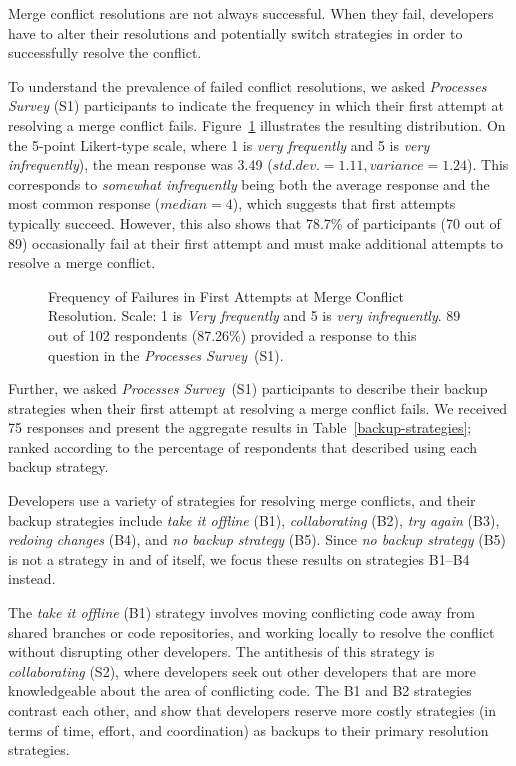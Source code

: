 
Merge conflict resolutions are not always successful.
When they fail, developers have to alter their resolutions and potentially switch strategies in order to successfully resolve the conflict.

To understand the prevalence of failed conflict resolutions, we asked \textit{Processes Survey} (S1) participants to indicate the frequency in which their first attempt at resolving a merge conflict fails.
Figure~\ref{fig:first-attempt-failure} illustrates the resulting distribution.
On the 5-point Likert-type scale, where 1 is \textit{very frequently} and 5 is \textit{very infrequently}), the mean response was 3.49 ($std. dev.=1.11, variance=1.24$).
This corresponds to \textit{somewhat infrequently} being both the average response and the most common response ($median=4$), which suggests that first attempts typically succeed.
However, this also shows that 78.7\% of participants (70 out of 89) occasionally fail at their first attempt and must make additional attempts to resolve a merge conflict.

\begin{figure}
	\centering
	\caption{Frequency of Failures in First Attempts at Merge Conflict Resolution. Scale: 1 is \textit{Very frequently} and 5 is \textit{very infrequently}. 89 out of 102 respondents (87.26\%) provided a response to this question in the \textit{Processes Survey}~(S1).}
	\label{fig:first-attempt-failure}
\end{figure}

Further, we asked \textit{Processes Survey}~(S1) participants to describe their backup strategies when their first attempt at resolving a merge conflict fails.
We received 75 responses and present the aggregate results in Table~\ref{backup-strategies}; ranked according to the percentage of respondents that described using each backup strategy.

Developers use a variety of strategies for resolving merge conflicts, and their backup strategies include \textit{take it offline} (B1), \textit{collaborating} (B2), \textit{try again} (B3), \textit{redoing changes} (B4), and \textit{no backup strategy} (B5).
Since \textit{no backup strategy} (B5) is not a strategy in and of itself, we focus these results on strategies B1--B4 instead.

The \textit{take it offline} (B1) strategy involves moving conflicting code away from shared branches or code repositories, and working locally to resolve the conflict without disrupting other developers.
The antithesis of this strategy is \textit{collaborating} (S2), where developers seek out other developers that are more knowledgeable about the area of conflicting code.
The B1 and B2 strategies contrast each other, and show that developers reserve more costly strategies (in terms of time, effort, and coordination) as backups to their primary resolution strategies.

